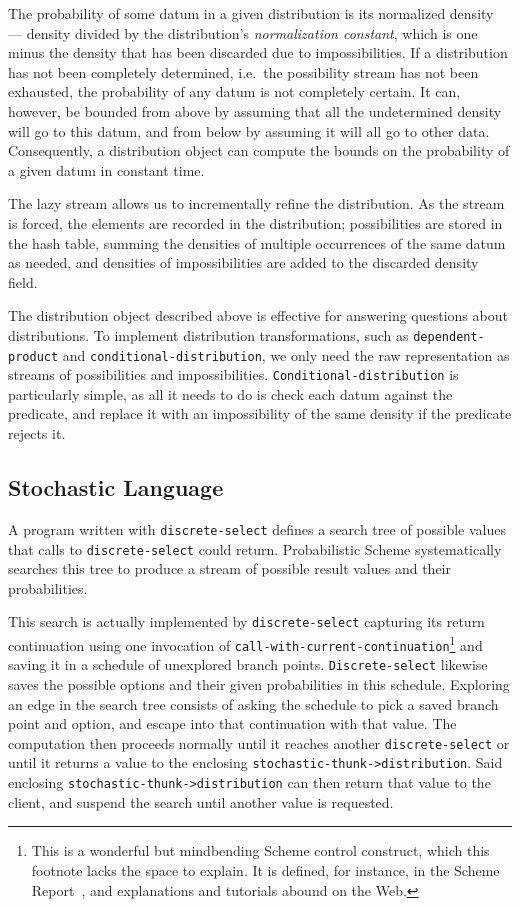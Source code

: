 \documentclass[10pt]{sigplanconf}
\newcommand{\code}[1]{\texttt{#1}}
\newcommand{\concept}[1]{\textit{#1}}
\begin{document}
The probability of some datum in a given distribution is its
 normalized density --- density divided by the distribution's
 \concept{normalization constant}, which is one minus the density that
 has been discarded due to impossibilities.
If a distribution has not been completely determined, i.e.\ the
 possibility stream has not been exhausted, the probability of any
 datum is not completely certain.
It can, however, be bounded from above by assuming that all the
 undetermined density will go to this datum, and from below by
 assuming it will all go to other data.
Consequently, a distribution object can compute the bounds on the
 probability of a given datum in constant time.

The lazy stream allows us to incrementally refine the distribution.
As the stream is forced, the elements are recorded in the
 distribution; possibilities are stored in the hash table, summing 
 the densities of multiple occurrences of the same datum as needed, and
 densities of impossibilities are added to the discarded density
 field.

The distribution object described above is effective for answering
questions about distributions.  To implement distribution
transformations, such as \code{dependent-product} and
\code{conditional-distribution}, we only need the raw representation
as streams of possibilities and impossibilities.
\code{Conditional-distribution} is
particularly simple, as all it needs to do is check each datum
against the predicate, and replace it with an impossibility of the
same density if the predicate rejects it.

\subsection{Stochastic Language}

A program written with \code{discrete-select} defines a search tree of
possible values that calls to \code{discrete-select} could return.
Probabilistic Scheme systematically searches this tree to produce a
stream of possible result values and their probabilities.

This search is actually implemented by \code{discrete-select}
capturing its return continuation using one invocation of
\code{call-with-current-continuation}\footnote{This is a wonderful but
mindbending Scheme control construct, which this footnote lacks the
space to explain.  It is defined, for instance, in the Scheme
Report~\cite{kelsey1998rra}, and explanations and tutorials abound on
the Web.} and saving it in a schedule of unexplored branch points.
\code{Discrete-select} likewise saves the possible options and their
given probabilities in this schedule.  Exploring an edge in the search
tree consists of asking the schedule to pick a saved branch point and
option, and escape into that continuation with that value.  The
computation then proceeds normally until it reaches another
\code{discrete-select} or until it returns a value to the enclosing
\code{stochastic-thunk->distribution}.  Said enclosing
\code{stochastic-thunk->distribution} can then return that value to
the client, and suspend the search until another value is requested.
\end{document}
